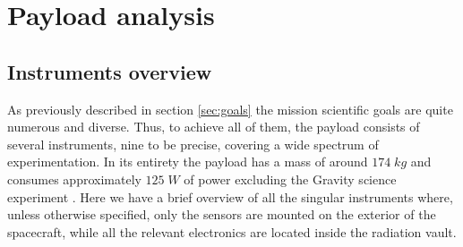 \section{Payload analysis}
\label{sec:payload}

\subsection{Instruments overview}
As previously described in section \ref{sec:goals} the mission scientific goals are quite numerous and diverse. Thus, to achieve all of them, the payload consists of several instruments, nine to be precise, covering a wide spectrum of experimentation. In its entirety the payload has a mass of around $174 \;kg$ and consumes approximately $125 \;W$ of power excluding the Gravity science experiment \cite{Key_requirements}.
Here we have a brief overview of all the singular instruments where, unless otherwise specified, only the sensors are mounted on the exterior of the spacecraft, while all the relevant electronics are located inside the radiation vault. 

